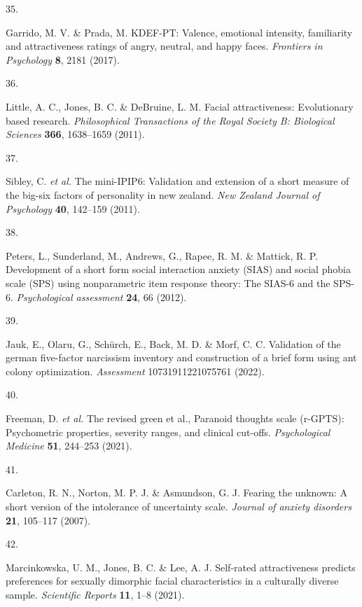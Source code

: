 \documentclass[
  man,floatsintext]{apa6}
\newlength{\cslhangindent}
\newlength{\csllabelwidth}
\newlength{\cslentryspacingunit} %
\newenvironment{CSLReferences}[2] %
 {%
  \setlength{\parindent}{0pt}
  \ifodd #1
  \let\oldpar\par
  \def\par{\hangindent=\cslhangindent\oldpar}
  \fi
  \setlength{\parskip}{#2\cslentryspacingunit}
 }%
 {}
\newcommand{\CSLLeftMargin}[1]{\parbox[t]{\csllabelwidth}{#1}}
\newcommand{\CSLRightInline}[1]{\parbox[t]{\linewidth - \csllabelwidth}{#1}\break}
\begin{document}
\begin{CSLReferences}{0}{0}
\leavevmode{}%
\CSLLeftMargin{35. }%
\CSLRightInline{Garrido, M. V. \& Prada, M. KDEF-PT: Valence, emotional intensity, familiarity and attractiveness ratings of angry, neutral, and happy faces. \emph{Frontiers in Psychology} \textbf{8}, 2181 (2017).}

\leavevmode{}%
\CSLLeftMargin{36. }%
\CSLRightInline{Little, A. C., Jones, B. C. \& DeBruine, L. M. Facial attractiveness: Evolutionary based research. \emph{Philosophical Transactions of the Royal Society B: Biological Sciences} \textbf{366}, 1638--1659 (2011).}

\leavevmode{}%
\CSLLeftMargin{37. }%
\CSLRightInline{Sibley, C. \emph{et al.} The mini-IPIP6: Validation and extension of a short measure of the big-six factors of personality in new zealand. \emph{New Zealand Journal of Psychology} \textbf{40}, 142--159 (2011).}

\leavevmode{}%
\CSLLeftMargin{38. }%
\CSLRightInline{Peters, L., Sunderland, M., Andrews, G., Rapee, R. M. \& Mattick, R. P. Development of a short form social interaction anxiety (SIAS) and social phobia scale (SPS) using nonparametric item response theory: The SIAS-6 and the SPS-6. \emph{Psychological assessment} \textbf{24}, 66 (2012).}

\leavevmode{}%
\CSLLeftMargin{39. }%
\CSLRightInline{Jauk, E., Olaru, G., Schürch, E., Back, M. D. \& Morf, C. C. Validation of the german five-factor narcissism inventory and construction of a brief form using ant colony optimization. \emph{Assessment} 10731911221075761 (2022).}

\leavevmode{}%
\CSLLeftMargin{40. }%
\CSLRightInline{Freeman, D. \emph{et al.} The revised green et al., Paranoid thoughts scale (r-GPTS): Psychometric properties, severity ranges, and clinical cut-offs. \emph{Psychological Medicine} \textbf{51}, 244--253 (2021).}

\leavevmode{}%
\CSLLeftMargin{41. }%
\CSLRightInline{Carleton, R. N., Norton, M. P. J. \& Asmundson, G. J. Fearing the unknown: A short version of the intolerance of uncertainty scale. \emph{Journal of anxiety disorders} \textbf{21}, 105--117 (2007).}

\leavevmode{}%
\CSLLeftMargin{42. }%
\CSLRightInline{Marcinkowska, U. M., Jones, B. C. \& Lee, A. J. Self-rated attractiveness predicts preferences for sexually dimorphic facial characteristics in a culturally diverse sample. \emph{Scientific Reports} \textbf{11}, 1--8 (2021).}


\end{CSLReferences}
\end{document}
